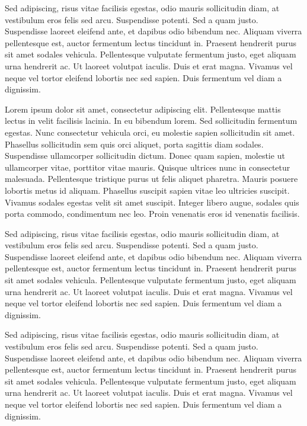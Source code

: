 Sed adipiscing, risus vitae facilisis egestas, odio mauris sollicitudin diam, at vestibulum eros felis sed arcu. Suspendisse potenti. Sed a quam justo. Suspendisse laoreet eleifend ante, et dapibus odio bibendum nec. Aliquam viverra pellentesque est, auctor fermentum lectus tincidunt in. Praesent hendrerit purus sit amet sodales vehicula. Pellentesque vulputate fermentum justo, eget aliquam urna hendrerit ac. Ut laoreet volutpat iaculis. Duis et erat magna. Vivamus vel neque vel tortor eleifend lobortis nec sed sapien. Duis fermentum vel diam a dignissim. 

Lorem ipsum dolor sit amet, consectetur adipiscing elit. Pellentesque mattis lectus in velit facilisis lacinia. In eu bibendum lorem. Sed sollicitudin fermentum egestas. Nunc consectetur vehicula orci, eu molestie sapien sollicitudin sit amet. Phasellus sollicitudin sem quis orci aliquet, porta sagittis diam sodales. Suspendisse ullamcorper sollicitudin dictum. Donec quam sapien, molestie ut ullamcorper vitae, porttitor vitae mauris. Quisque ultrices nunc in consectetur malesuada. Pellentesque tristique purus ut felis aliquet pharetra. Mauris posuere lobortis metus id aliquam. Phasellus suscipit sapien vitae leo ultricies suscipit. Vivamus sodales egestas velit sit amet suscipit. Integer libero augue, sodales quis porta commodo, condimentum nec leo. Proin venenatis eros id venenatis facilisis.

Sed adipiscing, risus vitae facilisis egestas, odio mauris sollicitudin diam, at vestibulum eros felis sed arcu. Suspendisse potenti. Sed a quam justo. Suspendisse laoreet eleifend ante, et dapibus odio bibendum nec. Aliquam viverra pellentesque est, auctor fermentum lectus tincidunt in. Praesent hendrerit purus sit amet sodales vehicula. Pellentesque vulputate fermentum justo, eget aliquam urna hendrerit ac. Ut laoreet volutpat iaculis. Duis et erat magna. Vivamus vel neque vel tortor eleifend lobortis nec sed sapien. Duis fermentum vel diam a dignissim. 

Sed adipiscing, risus vitae facilisis egestas, odio mauris sollicitudin diam, at vestibulum eros felis sed arcu. Suspendisse potenti. Sed a quam justo. Suspendisse laoreet eleifend ante, et dapibus odio bibendum nec. Aliquam viverra pellentesque est, auctor fermentum lectus tincidunt in. Praesent hendrerit purus sit amet sodales vehicula. Pellentesque vulputate fermentum justo, eget aliquam urna hendrerit ac. Ut laoreet volutpat iaculis. Duis et erat magna. Vivamus vel neque vel tortor eleifend lobortis nec sed sapien. Duis fermentum vel diam a dignissim. 


